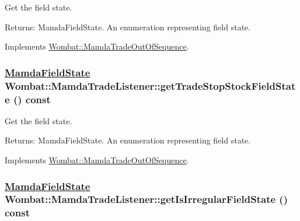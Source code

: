 Get the field state. 

\begin{Desc}
\item[Returns:]Mamda\-Field\-State. An enumeration representing field state. \end{Desc}


Implements \hyperlink{classWombat_1_1MamdaTradeOutOfSequence_1a060e2fe8efbc8fda0994cb8ea3d707}{Wombat::Mamda\-Trade\-Out\-Of\-Sequence}.\hypertarget{classWombat_1_1MamdaTradeListener_ba6a73453e3956f883f40b5ae7d127d0}{
\subsubsection[getTradeStopStockFieldState]{\setlength{\rightskip}{0pt plus 5cm}\hyperlink{namespaceWombat_93aac974f2ab713554fd12a1fa3b7d2a}{Mamda\-Field\-State} Wombat::Mamda\-Trade\-Listener::get\-Trade\-Stop\-Stock\-Field\-State () const}}
\label{classWombat_1_1MamdaTradeListener_ba6a73453e3956f883f40b5ae7d127d0}


Get the field state. 

\begin{Desc}
\item[Returns:]Mamda\-Field\-State. An enumeration representing field state. \end{Desc}


Implements \hyperlink{classWombat_1_1MamdaTradeOutOfSequence_c8c1bfde9213edffe475933823525ec9}{Wombat::Mamda\-Trade\-Out\-Of\-Sequence}.\hypertarget{classWombat_1_1MamdaTradeListener_f8e874c8dc039fb83f1e9f4a8bdcbc6f}{
\subsubsection[getIsIrregularFieldState]{\setlength{\rightskip}{0pt plus 5cm}\hyperlink{namespaceWombat_93aac974f2ab713554fd12a1fa3b7d2a}{Mamda\-Field\-State} Wombat::Mamda\-Trade\-Listener::get\-Is\-Irregular\-Field\-State () const}}
\label{classWombat_1_1MamdaTradeListener_f8e874c8dc039fb83f1e9f4a8bdcbc6f}


